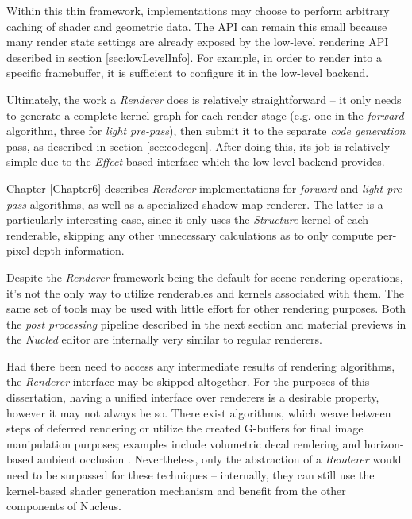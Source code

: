 Within this thin framework, implementations may choose to perform arbitrary caching of shader and geometric data. The API can remain this small because many render state settings are already exposed by the low-level rendering API described in section \ref{sec:lowLevelInfo}. For example, in order to render into a specific framebuffer, it is sufficient to configure it in the low-level backend.

Ultimately, the work a \emph{Renderer} does is relatively straightforward -- it only needs to generate a complete kernel graph for each render stage (e.g. one in the \emph{forward} algorithm, three for \emph{light pre-pass}), then submit it to the separate \emph{code generation} pass, as described in section \ref{sec:codegen}. After doing this, its job is relatively simple due to the \emph{Effect}-based interface which the low-level backend provides.

Chapter \ref{Chapter6} describes \emph{Renderer} implementations for \emph{forward} and \emph{light pre-pass} algorithms, as well as a specialized shadow map renderer. The latter is a particularly interesting case, since it only uses the \emph{Structure} kernel of each renderable, skipping any other unnecessary calculations as to only compute per-pixel depth information.

Despite the \emph{Renderer} framework being the default for scene rendering operations, it's not the only way to utilize renderables and kernels associated with them. The same set of tools may be used with little effort for other rendering purposes. Both the \emph{post processing} pipeline described in the next section and material previews in the \emph{Nucled} editor are internally very similar to regular renderers.

Had there been need to access any intermediate results of rendering algorithms, the \emph{Renderer} interface may be skipped altogether. For the purposes of this dissertation, having a unified interface over renderers is a desirable property, however it may not always be so. There exist algorithms, which weave between steps of deferred rendering or utilize the created G-buffers for final image manipulation purposes; examples include volumetric decal rendering \cite{VolumeDecals} and horizon-based ambient occlusion \cite{HBAO}. Nevertheless, only the abstraction of a \emph{Renderer} would need to be surpassed for these techniques -- internally, they can still use the kernel-based shader generation mechanism and benefit from the other components of Nucleus.

